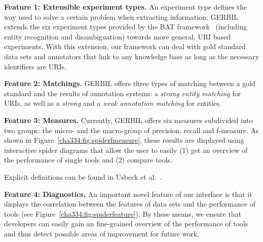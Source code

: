 \textbf{Feature 1: Extensible experiment types.}
An experiment type defines the way used to solve a certain problem when extracting information.
GERBIL extends the six experiment types provided by the BAT framework~\cite{cornolti} (including entity recognition and disambiguation) towards more general, URI based experiments.
With this extension, our framework can deal with gold standard data sets and annotators that link to any knowledge base as long as the necessary identifiers are URIs.

\textbf{Feature 2: Matchings.}
GERBIL offers three types of matching between a gold standard and the results of annotation systems: a \emph{strong entity matching} for URIs, as well as a  \emph{strong} and a \emph{weak annotation matching} for entities.

\textbf{Feature 3: Measures.}
Currently, GERBIL offers six measures subdivided into two groups: the micro- and the macro-group of precision, recall and f-measure. As shown in Figure~\ref{cha334:fig:spiderfmeasure}, these results are displayed using interactive spider diagrams that allow the user to easily (1) get an overview of the performance of single tools and (2) compare tools.%

Explicit definitions can be found in Usbeck et al.~\cite{GERBIL}.

\textbf{Feature 4: Diagnostics.}
An important novel feature of our interface is that it displays the correlation between the features of data sets and the performance of tools (see Figure~\ref{cha334:fig:spiderfeature}). By these means, we ensure that developers can easily gain an fine-grained overview of the performance of tools
and thus detect possible areas of improvement for future work. 



